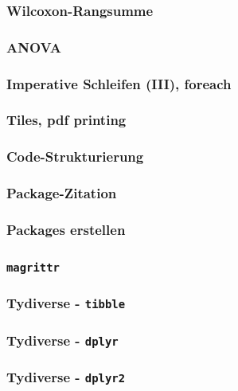 \documentclass[paper=A4, pagesize, DIV=calc, smallheadings,
fontsize=12pt, expansion=false]{scrreprt}
\begin{document}
\subsubsection{Wilcoxon-Rangsumme}

\subsubsection*{ANOVA}

\subsubsection{Imperative Schleifen (III), foreach}

\subsubsection{Tiles, pdf printing}

\subsubsection{Code-Strukturierung}

\subsubsection{Package-Zitation}

\subsubsection{Packages erstellen}

\subsubsection{\texttt{magrittr}}

\subsubsection{Tydiverse - \texttt{tibble}}

\subsubsection{Tydiverse - \texttt{dplyr}}

\subsubsection{Tydiverse - \texttt{dplyr2}}
\end{document}
